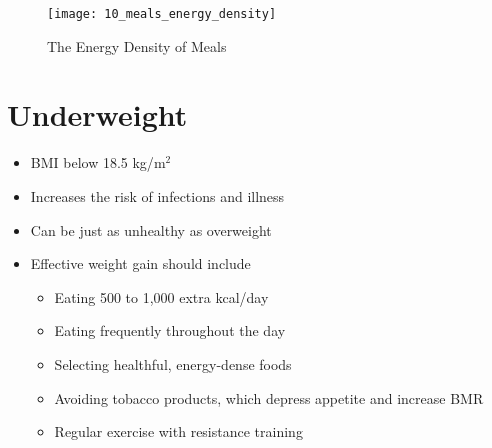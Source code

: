 \documentclass[title={Chapter 10: Achieving and Maintaining a Healthful Body Weight}]{fdsn201notes}
\begin{document}
\begin{figure}[H]
	\centering
	\texttt{[image: 10\_meals\_energy\_density]}
	\caption{The Energy Density of Meals}
	\label{fig:meals-energy-density}
\end{figure}

\section{Underweight}\label{sec:underweight}
\begin{itemize}
	\item BMI below 18.5 kg/$\mbox{m}^{2}$
	\item Increases the risk of infections and illness
	\item Can be just as unhealthy as overweight
	\item Effective weight gain should include
	\begin{itemize}
		\item Eating 500 to 1,000 extra kcal/day
		\item Eating frequently throughout the day
		\item Selecting healthful, energy-dense foods
		\item Avoiding tobacco products, which depress appetite and increase BMR
		\item Regular exercise with resistance training
	\end{itemize}
\end{itemize}
\end{document}
